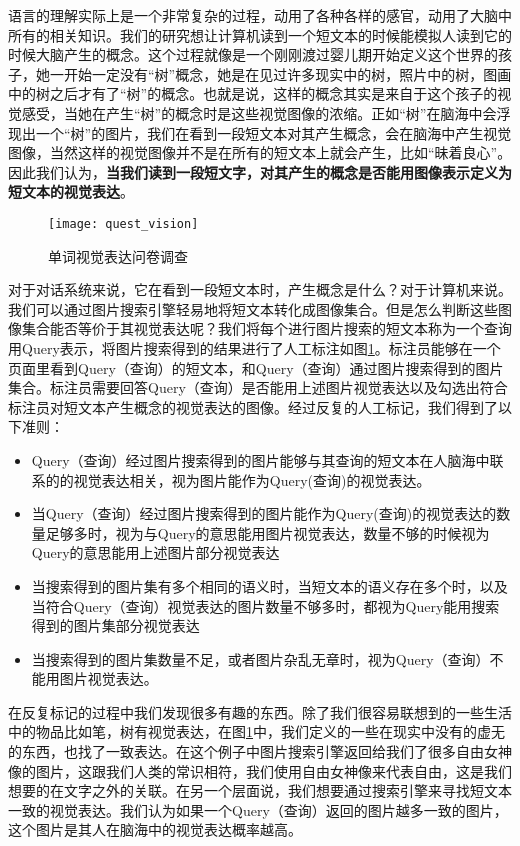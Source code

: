 语言的理解实际上是一个非常复杂的过程，动用了各种各样的感官，动用了大脑中所有的相关知识。我们的研究想让计算机读到一个短文本的时候能模拟人读到它的时候大脑产生的概念。这个过程就像是一个刚刚渡过婴儿期开始定义这个世界的孩子，她一开始一定没有“树”概念，她是在见过许多现实中的树，照片中的树，图画中的树之后才有了“树”的概念。也就是说，这样的概念其实是来自于这个孩子的视觉感受，当她在产生“树”的概念时是这些视觉图像的浓缩。正如“树”在脑海中会浮现出一个“树”的图片，我们在看到一段短文本对其产生概念，会在脑海中产生视觉图像，当然这样的视觉图像并不是在所有的短文本上就会产生，比如“昧着良心”。因此我们认为，\textbf{当我们读到一段短文字，对其产生的概念是否能用图像表示定义为短文本的视觉表达}。
\begin{figure}[ht]
\centering
\texttt{[image: quest\_vision]}
\caption{单词视觉表达问卷调查} \label{fig:quest_vision}
\end{figure}
对于对话系统来说，它在看到一段短文本时，产生概念是什么？对于计算机来说。我们可以通过图片搜索引擎轻易地将短文本转化成图像集合。但是怎么判断这些图像集合能否等价于其视觉表达呢？我们将每个进行图片搜索的短文本称为一个查询用Query表示，将图片搜索得到的结果进行了人工标注如图\ref{fig:quest_vision}。标注员能够在一个页面里看到Query（查询）的短文本，和Query（查询）通过图片搜索得到的图片集合。标注员需要回答Query（查询）是否能用上述图片视觉表达以及勾选出符合标注员对短文本产生概念的视觉表达的图像。经过反复的人工标记，我们得到了以下准则：
\begin{itemize}
	\item     Query（查询）经过图片搜索得到的图片能够与其查询的短文本在人脑海中联系的的视觉表达相关，视为图片能作为Query(查询)的视觉表达。
	\item  当Query（查询）经过图片搜索得到的图片能作为Query(查询)的视觉表达的数量足够多时，视为与Query的意思能用图片视觉表达，数量不够的时候视为Query的意思能用上述图片部分视觉表达
	\item   当搜索得到的图片集有多个相同的语义时，当短文本的语义存在多个时，以及当符合Query（查询）视觉表达的图片数量不够多时，都视为Query能用搜索得到的图片集部分视觉表达
	\item    当搜索得到的图片集数量不足，或者图片杂乱无章时，视为Query（查询）不能用图片视觉表达。
\end{itemize}

在反复标记的过程中我们发现很多有趣的东西。除了我们很容易联想到的一些生活中的物品比如笔，树有视觉表达，在图\ref{fig:quest_vision}中，我们定义的一些在现实中没有的虚无的东西，也找了一致表达。在这个例子中图片搜索引擎返回给我们了很多自由女神像的图片，这跟我们人类的常识相符，我们使用自由女神像来代表自由，这是我们想要的在文字之外的关联。在另一个层面说，我们想要通过搜索引擎来寻找短文本一致的视觉表达。我们认为如果一个Query（查询）返回的图片越多一致的图片，这个图片是其人在脑海中的视觉表达概率越高。

